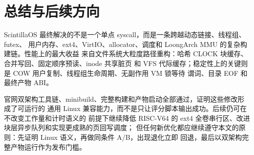 \documentclass[UTF8,zihao=-4]{ctexart}
\begin{document}
\section{总结与后续方向}

ScintillaOS 最终解决的不是一个单点 syscall，而是一条跨越动态链接、线程组、futex、
用户内存、ext4、VirtIO、allocator、调度和 LoongArch MMU 的复杂构建链。性能上的最大收益
来自文件系统大粒度路径重构：哈希 CLOCK 块缓存、合并写回、固定顺序预读、inode 共享脏页
和 VFS 代际缓存；稳定性上的关键则是 COW 用户复制、线程组生命周期、无副作用 VM 锁等待
谓词、目录 EOF 和最终产物 ABI。

官网双架构工具链、minibuild、完整构建和产物启动全部通过，证明这些修改形成了可运行的
通用 Linux 兼容能力，而不是只让评分脚本输出成功。后续仍可在不改变工作量和计时语义的
前提下继续降低 RISC-V64 的 ext4 全卷串行区、改进块层异步队列和实现更成熟的页回写调度；
但任何新优化都应继续遵守本文的原则：先证明 Linux 语义，再做同条件 A/B，出现退化立即
回退，最后以双架构完整产物运行作为发布门槛。
\end{document}
